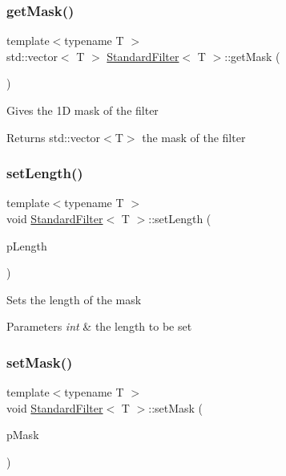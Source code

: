 \subsubsection{\texorpdfstring{get\+Mask()}{getMask()}}
{\footnotesize\ttfamily template$<$typename T $>$ \\
std\+::vector$<$ T $>$ \hyperlink{class_standard_filter}{Standard\+Filter}$<$ T $>$\+::get\+Mask (\begin{DoxyParamCaption}{ }\end{DoxyParamCaption})}

Gives the 1D mask of the filter \begin{DoxyReturn}{Returns}
std\+::vector$<$\+T$>$ the mask of the filter 
\end{DoxyReturn}
\mbox{\label{class_standard_filter_af441d21022cd441f08421de8cd714d53}} 
\subsubsection{\texorpdfstring{set\+Length()}{setLength()}}
{\footnotesize\ttfamily template$<$typename T $>$ \\
void \hyperlink{class_standard_filter}{Standard\+Filter}$<$ T $>$\+::set\+Length (\begin{DoxyParamCaption}\item[{int}]{p\+Length }\end{DoxyParamCaption})}

Sets the length of the mask 
\begin{DoxyParams}{Parameters}
{\em int} & the length to be set \\
\hline
\end{DoxyParams}
\mbox{\label{class_standard_filter_abef27f90eea94d34607e24dd026a281e}} 
\subsubsection{\texorpdfstring{set\+Mask()}{setMask()}}
{\footnotesize\ttfamily template$<$typename T $>$ \\
void \hyperlink{class_standard_filter}{Standard\+Filter}$<$ T $>$\+::set\+Mask (\begin{DoxyParamCaption}\item[{std\+::vector$<$ T $>$}]{p\+Mask }\end{DoxyParamCaption})}

